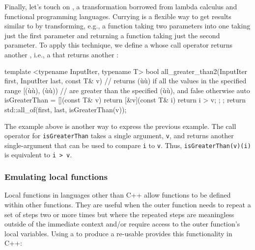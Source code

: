 Finally, let's touch on , a transformation borrowed
from lambda calculus and functional programming languages. Currying is a
flexible way to get results similar to  by
transforming, e.g., a function taking two parameters into one taking
just the first parameter and returning a function taking just the second
parameter. To apply this technique, we define a  whose call operator returns another , i.e., a  that returns another
:

\begin{emcppslisting}
template <typename InputIter, typename T>
bool all_greater_than2(InputIter first, InputIter last, const T& v)
    // returns (ù{}ù) if all the values in the specified range [(ù{}ù), (ù{}ù))
    // are greater than the specified (ù{}ù), and false otherwise
{
    auto isGreaterThan = [](const T& v){
        return [&v](const T& i){ return i > v; };
    };
    return std::all_of(first, last, isGreaterThan(v));
}
\end{emcppslisting}
    

The example above is another way to express the previous example. The
call operator for \lstinline!isGreaterThan! takes a single argument,
\lstinline!v!, and returns another single-argument 
that can be used to compare \lstinline!i! to \lstinline!v!. Thus,
\lstinline!isGreaterThan(v)(i)! is equivalent to
\lstinline!i!~\lstinline!>!~\lstinline!v!.

\subsubsection[Emulating local functions]{Emulating local functions}\label{emulating-local-functions}

Local functions in languages other than C++ allow functions to be
defined within other functions. They are useful when the outer function
needs to repeat a set of steps two or more times but where the repeated
steps are meaningless outside of the immediate context and/or require
access to the outer function's local variables. Using a  to produce a re-usable  provides this
functionality in C++:

